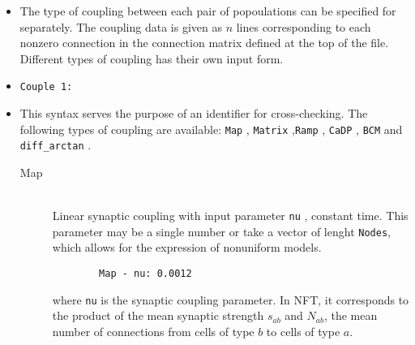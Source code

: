 \documentclass[12pt,a4paper]{article}
\newcommand{\type}[1]{{\small\small\tt #1} }
\begin{document}
\begin{itemize}

\item The type of coupling between each pair of popoulations can be specified for separately. The coupling data is given as $n$ lines  corresponding to each nonzero connection in the connection matrix defined at the top of the file. Different types of coupling has their own input form. 
\item \begin{lstlisting}
Couple 1:
\end{lstlisting}
\item This syntax serves the purpose of an identifier for cross-checking. The following types of coupling are available:  \type{Map},  \type{Matrix},\type{Ramp}, \type{CaDP}, \type{BCM} and \type{diff\_arctan}. 
\begin{description}

\item[Map]\ \\
	Linear synaptic coupling with input parameter \type{nu}, constant time.
	This parameter may be a single number or take a vector of lenght
	\texttt{Nodes}, which allows for the expression of nonuniform models.
	\begin{lstlisting}
    	Map - nu: 0.0012
	\end{lstlisting}
	where \type{nu} is the synaptic coupling parameter. In NFT, it corresponds
	to the product of the mean synaptic strength $s_{ab}$ and $N_{ab}$, the
	mean number of connections from cells of type $b$ to cells of type $a$.




\end{description}
\end{itemize}
\end{document}
